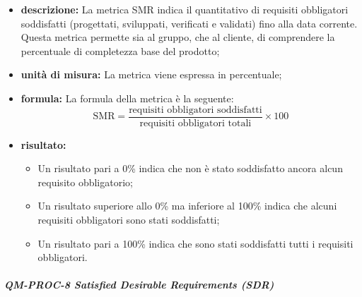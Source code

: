 			\begin{itemize}

				\item \textbf{descrizione: }
				La metrica SMR indica il quantitativo di requisiti obbligatori soddisfatti (progettati, sviluppati, verificati e validati) fino alla data corrente. Questa metrica permette sia al gruppo, che al cliente, di comprendere la percentuale di completezza base del prodotto;

				\item \textbf{unità di misura: }
				La metrica viene espressa in percentuale;

				\item \textbf{formula: }
				La formula della metrica è la seguente:
				\[
					\text{SMR} = \frac{\text{requisiti obbligatori soddisfatti}}{\text{requisiti obbligatori totali}} \times 100
				\]

				\item \textbf{risultato: }
				\begin{itemize}
					\item Un risultato pari a 0\% indica che non è stato soddisfatto ancora alcun requisito obbligatorio;
					\item Un risultato superiore allo 0\% ma inferiore al 100\% indica che alcuni requisiti obbligatori sono stati soddisfatti;
					\item Un risultato pari a 100\% indica che sono stati soddisfatti tutti i requisiti obbligatori.
				\end{itemize}

			\end{itemize}

			\subparagraph{QM-PROC-8 Satisfied Desirable Requirements (SDR)}

